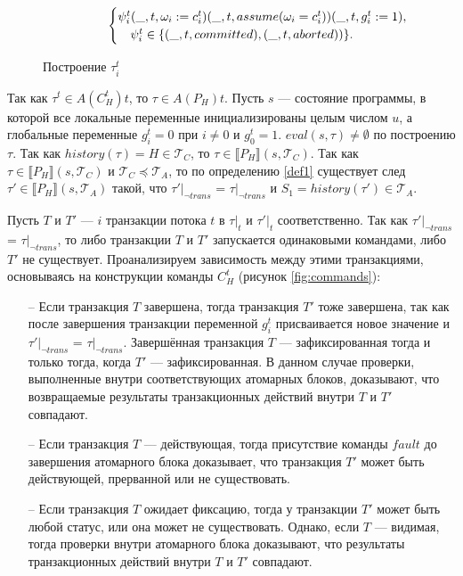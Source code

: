 \begin{myproof}
\begin{figure}
\begin{align*}
\begin{cases}
    \mathrlap{\psi^t_i(\_,t,\omega_i := c^t_i)(\_,t,assume(\omega_i = c^t_i))(\_,t,g^t_i := 1),}\\
                                    & \psi^t_i \in \{(\_,t,committed), (\_,t,aborted))\}.       
  \end{cases}
\end{align*}
\caption{Построение $\tau^t_i$}
\label{fig:subtraces}
\end{figure}
Так как $\tau^t \in A(C^t_H)t$, то $\tau \in A(P_H)t$. Пусть $s$ --- состояние программы, в которой все локальные переменные инициализированы целым числом $u$, а глобальные переменные $g^t_i = 0$ при $i \neq 0$ и $g^t_0 = 1$. $eval(s,\tau) \neq \emptyset$ по построению $\tau$. Так как $history(\tau) = H \in \mathcal{T}_C$, то $\tau \in \llbracket P_H \rrbracket(s,\mathcal{T}_C)$. Так как $\tau \in \llbracket P_H \rrbracket(s,\mathcal{T}_C)$ и $\mathcal{T}_C \preceq \mathcal{T}_A$, то по определению \ref{def1} %
существует след $\tau' \in \llbracket P_H \rrbracket(s,\mathcal{T}_A)$ такой, что $\tau'|_{\neg trans}$ = $\tau|_{\neg trans}$ и $S_1 = history(\tau') \in \mathcal{T}_A$.

Пусть $T$ и $T'$ --- $i$ транзакции потока $t$ в $\tau|_t$ и $\tau'|_t$ соответственно. Так как $\tau'|_{\neg trans}$ = $\tau|_{\neg trans}$, то либо транзакции $T$ и $T'$ запускается одинаковыми командами, либо $T'$ не существует. Проанализируем зависимость между этими транзакциями, основываясь на конструкции команды $C^t_H$ (рисунок \ref{fig:commands}):
\begin{itemize}
\item[--] Если транзакция $T$ завершена, тогда транзакция $T'$ тоже завершена, так как после завершения транзакции переменной $g^t_i$ присваивается новое значение и $\tau'|_{\neg trans}$ = $\tau|_{\neg trans}$. Завершённая транзакция $T$ --- зафиксированная тогда и только тогда, когда $T'$ --- зафиксированная. В данном случае проверки, выполненные внутри соответствующих атомарных блоков, доказывают, что возвращаемые результаты транзакционных действий внутри $T$ и $T'$ совпадают.
\item[--] Если транзакция $T$ --- действующая, тогда присутствие команды $fault$ до завершения атомарного блока доказывает, что транзакция $T'$ может быть действующей, прерванной или не существовать. 
\item[--] Если транзакция $T$ ожидает фиксацию, тогда у транзакции $T'$ может быть любой статус, или она может не существовать. Однако, если $T$  --- видимая, тогда проверки внутри атомарного блока доказывают, что результаты транзакционных действий внутри $T$ и $T'$ совпадают.
\end{itemize}


\end{myproof}
